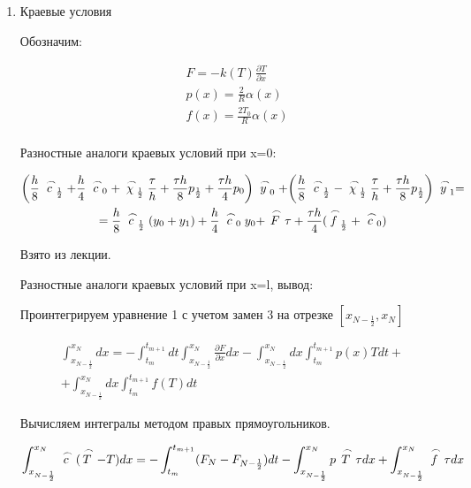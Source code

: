 \documentclass[a4paper,14pt]{extreport} %
\begin{document}
\begin{enumerate}
\item Краевые условия

Обозначим:

\begin{equation}
\begin{aligned}
&F=-k(T)\frac{\partial T}{\partial x}\\
&p(x)=\frac{2}{R}\alpha(x)\\
&f(x)=\frac{2T_0}{R}\alpha(x)\\
\end{aligned}
\end{equation}

Разностные аналоги краевых условий при x=0:

\begin{multline}
\bigg(\frac{h}{8}\buildrel\,\,\frown\over{c}_{\frac{1}{2}}+ \frac{h}{4}\buildrel\,\,\frown\over{c}_0+\buildrel\,\,\frown\over{\chi}_{\frac{1}{2}}\frac{\tau}{h}+\frac{\tau h}{8}p_{\frac{1}{2}}+\frac{\tau h}{4}p_0\bigg)\buildrel\,\,\frown\over{y}_0+\bigg(\frac{h}{8}\buildrel\,\,\frown\over{c}_{\frac{1}{2}}-\buildrel\,\,\frown\over{\chi}_{\frac{1}{2}}\frac{\tau}{h}+\frac{\tau h}{8}p_{\frac{1}{2}}\bigg)\buildrel\,\,\frown\over{y}_1=\\
= \frac{h}{8}\buildrel\,\,\frown\over{c}_{\frac{1}{2}}(y_0+y_1)+\frac{h}{4}\buildrel\,\,\frown\over{c}_0y_0+\buildrel\,\,\frown\over{F}\tau+\frac{\tau h}{4}(\buildrel\,\,\frown\over{f}_{\frac{1}{2}}+\buildrel\,\,\frown\over{c}_0)
\end{multline}

Взято из лекции. 

Разностные аналоги краевых условий при x=l, вывод:

Проинтегрируем уравнение 1 с учетом замен 3 на отрезке $[x_{N-\frac{1}{2}},x_N]$

\begin{multline*}
\int^{x_N}_{x_{N-{\frac{1}{2}}}}dx=-\int^{t_{m+1}}_{t_{m}}dt\int^{x_N}_{x_{N-{\frac{1}{2}}}}\frac{\partial F}{\partial x}dx-\int^{x_N}_{x_{N-{\frac{1}{2}}}}dx\int^{t_{m+1}}_{t_{m}}p(x)Tdt+\\
+\int^{x_N}_{x_{N-{\frac{1}{2}}}}dx\int^{t_{m+1}}_{t_{m}}f(T)dt
\end{multline*}

Вычисляем интегралы методом правых прямоугольников. 

\begin{multline*}
\int^{x_N}_{x_{N-{\frac{1}{2}}}}\buildrel\,\,\frown\over{c}(\buildrel\,\,\frown\over{T}-T)dx=-\int^{t_{m+1}}_{t_{m}}(F_N-F_{N-\frac{1}{2}})dt-\int^{x_N}_{x_{N-{\frac{1}{2}}}}p\buildrel\,\,\frown\over{T}\tau dx+\int^{x_N}_{x_{N-{\frac{1}{2}}}}\buildrel\,\,\frown\over{f}\tau dx
\end{multline*}


\end{enumerate}
\end{document}
